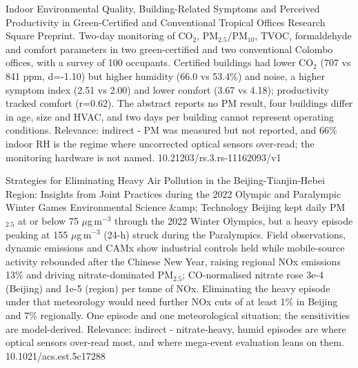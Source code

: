 \documentclass[10pt]{article}
\begin{document}
{Indoor Environmental Quality, Building-Related Symptoms and Perceived Productivity in Green-Certified and Conventional Tropical Offices}
{Research Square}
{Preprint. Two-day monitoring of CO$_2$, PM$_{2.5}$/PM$_{10}$, TVOC, formaldehyde and comfort parameters in two green-certified and two conventional Colombo offices, with a survey of 100 occupants. Certified buildings had lower CO$_2$ (707 vs 841 ppm, d=-1.10) but higher humidity (66.0 vs 53.4\%) and noise, a higher symptom index (2.51 vs 2.00) and lower comfort (3.67 vs 4.18); productivity tracked comfort (r=0.62). The abstract reports no PM result, four buildings differ in age, size and HVAC, and two days per building cannot represent operating conditions. Relevance: indirect - PM was measured but not reported, and 66\% indoor RH is the regime where uncorrected optical sensors over-read; the monitoring hardware is not named.}
{10.21203/rs.3.rs-11162093/v1}

\par{}\baselineskip{}\baselineskip
{}

{Strategies for Eliminating Heavy Air Pollution in the Beijing-Tianjin-Hebei Region: Insights from Joint Practices during the 2022 Olympic and Paralympic Winter Games}
{Environmental Science \&amp; Technology}
{Beijing kept daily PM$_{2.5}$ at or below 75 $\mu$g\,m$^{-3}$ through the 2022 Winter Olympics, but a heavy episode peaking at 155 $\mu$g\,m$^{-3}$ (24-h) struck during the Paralympics. Field observations, dynamic emissions and CAMx show industrial controls held while mobile-source activity rebounded after the Chinese New Year, raising regional NOx emissions 13\% and driving nitrate-dominated PM$_{2.5}$; CO-normalised nitrate rose 3e-4 (Beijing) and 1e-5 (region) per tonne of NOx. Eliminating the heavy episode under that meteorology would need further NOx cuts of at least 1\% in Beijing and 7\% regionally. One episode and one meteorological situation; the sensitivities are model-derived. Relevance: indirect - nitrate-heavy, humid episodes are where optical sensors over-read most, and where mega-event evaluation leans on them.}
{10.1021/acs.est.5c17288}
\end{document}
